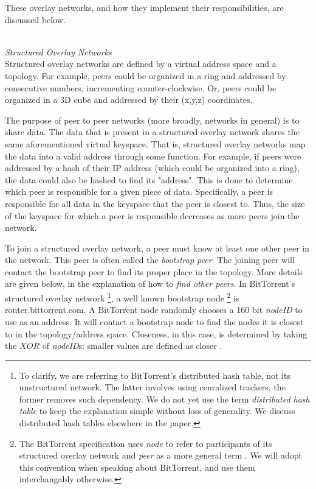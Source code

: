 \documentclass[a4paper]{article}
\begin{document}
These overlay networks, and how they implement their responsibilities, are discussed below.

\hfill \\
\textit{Structured Overlay Networks}
\hfill \\

Structured overlay networks are defined by a virtual address space and a topology. For example, peers could be organized in a ring and addressed by consecutive numbers, incrementing counter-clockwise. Or, peers could be organized in a 3D cube and addressed by their (x,y,z) coordinates.

The purpose of peer to peer networks (more broadly, networks in general) is to share data. The data that is present in a structured overlay network shares the same aforementioned virtual keyspace. That is, structured overlay networks map the data into a valid address through some function. For example, if peers were addressed by a hash of their IP address (which could be organized into a ring), the data could also be hashed to find its "address". This is done to determine which peer is responsible for a given piece of data. Specifically, a peer is responsible for all data in the keyspace that the peer is closest to. Thus, the size of the keyspace for which a peer is responsible decreases as more peers join the network.

To join a structured overlay network, a peer must know at least one other peer in the network. This peer is often called the \textit{bootstrap peer}. The joining peer will contact the bootstrap peer to find its proper place in the topology. More details are given below, in the explanation of how to \textit{find other peers}. In BitTorrent's structured overlay network \footnote{To clarify, we are referring to BitTorrent's distributed hash table, not its unstructured network. The latter involves using cenralized trackers, the former removes such dependency. We do not yet use the term \textit{distributed hash table} to keep the explanation simple without loss of generality. We discuss distributed hash tables elsewhere in the paper.}, a well known bootstrap node \footnote{The BitTorrent specification uses \textit{node} to refer to participants of its structured overlay network and \textit{peer} as a more general term \cite{bittorrentDHT}. We will adopt this convention when speaking about BitTorrent, and use them interchangably otherwise.} is router.bittorrent.com. A BitTorrent node randomly chooses a 160 bit \textit{nodeID} to use as an address. It will contact a bootstrap node to find the nodes it is closest to in the topology/address space. Closeness, in this case, is determined by taking the $XOR$ of \textit{nodeID}s; smaller values are defined as closer \cite{bittorrentDHT}.
\end{document}
